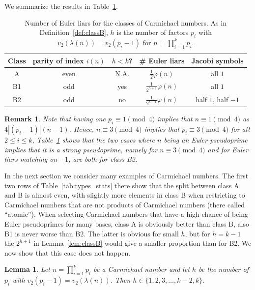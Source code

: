 \documentclass[runningheads]{amsart}
\newtheorem{lemma}[theorem]{Lemma}
\newtheorem{remark}[theorem]{Remark}
\begin{document}
We
 summarize
the results in
Table~\ref{tab:car_eliars}.

\begin{table}
\begin{tabular}{|ccc|c|c|}
\hline
Class
&
parity of index $i(n)$
&
$h<k$?
&
\#
Euler liars
                    &
Jacobi symbols
         \\
\hline
A
   &
even
  &
N.A.
&
$
\frac{1}{2}
\varphi(n)
$
      &
all $ 1 $
              \\[1mm]
B1
  &
odd
  &
yes
  &
$
\frac{1}{2^{h+1}}
\varphi(n)
$
      &
all $ 1 $
              \\[1mm]
B2
  &
odd
  &
no
   &
$
\frac{1}{2^{k-1}}
\varphi(n)
$
&
half $ 1 $,
half $ -1 $
\\[1mm]
\hline
\end{tabular}
\caption{Number of Euler liars for the classes of Carmichael numbers. As in
Definition~\ref{def:classB},
$h$ is the number of factors
$p_i$
with
$v_2(\lambda(n))
=
v_2(p_i-1)$
for
$n=\prod_{i=1}^kp_i$.}
\label{tab:car_eliars}
\end{table}

\begin{remark}
Note that having one
$p_i\equiv
1
\pmod
4$ implies that
$n\equiv
1
\pmod
4$ as
$4|(p_i
-
1)|(n-1)$.
Hence,
$n\equiv
3
\pmod
4$ implies that
$p_i\equiv
3
\pmod 4$ for all $2\le i\le k$,
Table~\ref{tab:car_eliars}
shows that the two cases where $n$ being an Euler pseudoprime implies that it is a
strong pseudoprime,
namely for $n
\equiv
3
\pmod 4$ and for Euler liars matching on $-1$,  are both for class B2.
\end{remark}

In the next section we consider many examples of Carmichael numbers.
The first two rows of
Table~\ref{tab:types_stats}
there show that the split between class A and B is almost even,
with slightly more elements in class B when restricting to Carmichael numbers that
are not products of Carmichael numbers (there called ``atomic'').
When selecting Carmichael numbers that have a high chance of being Euler pseudoprimes
for many bases,
class A is obviously better than class B,
also B1 is never worse than B2.
The latter is obvious for small $h$,
but for $h = k-1$ the
$2^{h+1}$
in
Lemma~\ref{lem:classB}
would give a smaller proportion than for B2.
We now show that this case does not happen.

\begin{lemma}
Let
$n=\prod_{i=1}^k
p_i$
be a Carmichael number and let $h$ be the number of
$p_i$
with
$v_2(p_i
-1) =
v_2(\lambda(n))$.
Then
$h\in
\{1,2,3,\ldots
,
k-2,k\}$.
\end{lemma}
\end{document}
